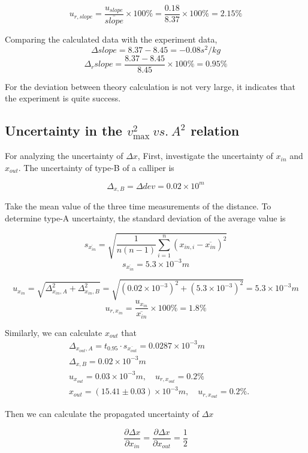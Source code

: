 $$ u_{r,slope} = \frac{u_{slope}}{\bar{slope}} \times 100 \%
               =\frac{0.18}{8.37} \times 100 \% = 2.15\% $$

Comparing the calculated data with the experiment data,
$$   \Delta slope = 8.37 - 8.45 = -0.08 s^2/kg        				   $$
$$   \Delta_r slope = \frac{ 8.37 - 8.45}{8.45} \times 100\% = 0.95 \%  $$

For the deviation between theory calculation is not very large, it indicates that the experiment is quite success.


\subsection{Uncertainty in the $v_{\max}^2\ vs.\ A^2$ relation}

For analyzing the uncertainty of $\Delta x$,
First, investigate the uncertainty of $x_{in}$ and $x_{out}$. 
The uncertainty of type-B of a calliper is 

$$\Delta_{x,B} = \Delta{dev} = 0.02 \times 10^m   $$ 

Take the mean value of the three time measurements of the distance.
To determine type-A uncertainty, the standard deviation of the average value is 

$$   s_{\overline{x_{in}}} = \sqrt{\frac{1}{n(n-1)}\sum_{i=1}^n(x_{in,i}-\overline{x_{in}})^2} $$
$$   s_{\overline{x_{in}}} = 5.3 \times 10^{-3} m 		$$

$$  u_{x_{in}}=\sqrt{\Delta_{x_{in},A}^2+\Delta_{x_{in},B}^2}
     = \sqrt{(0.02 \times 10^{-3} )^2
	 +(5.3 \times 10^{-3})^2} 
	 = 5.3 \times 10^{-3} m $$
$$  u_{r,x_{in}}=\frac{u_{x_{in}}}{\overline{x_{in}}}\times 100\%=1.8\%$$

Similarly, we can calculate $x_{out}$ that
\[
\begin{split}
    &\Delta_{x_{out},A}=t_{0.95}\cdot s_{\overline{x_{out}}}=0.0287\times10^{-3}m\\
    &\Delta_{x,B}=0.02\times10^{-3}m\\
    &u_{x_{out}}=0.03\times10^{-3}m,\quad
    u_{r,x_{out}}=0.2 \%    \\
    &x_{out}=(15.41\pm 0.03) \times10^{-3}m,\quad u_{r,x_{out}}=0.2\%.
\end{split}
\]

Then we can calculate the propagated uncertainty of $\Delta x$

$$\frac{\partial\Delta x}{\partial x_{in}}=\frac{\partial\Delta x}{\partial x_{out}}=\frac{1}{2}  $$


